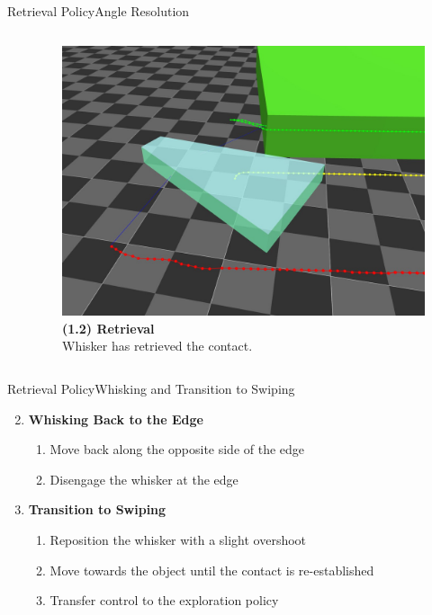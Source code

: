 \documentclass[AIRbeamer
,optEnglish
,optBiber
,optBibstyleAlphabetic
,optBeamerClassicFormat%
]{AIRlatex}
\begin{document}
\begin{frame}[c]{Retrieval Policy}{Angle Resolution}
\begin{columns}[T,onlytextwidth]
\begin{column}[T]{0.48\textwidth}
            \end{column}
            \begin{column}[T]{0.48\textwidth}
                \begin{figure}[H]
                    \centering
                    \captionsetup{justification=centering}
                    \includegraphics[width=\textwidth]{figures/retrieval/retrieval}
                    \caption{\textbf{(1.2) Retrieval}\\Whisker has retrieved the contact.}
                \end{figure}
            \end{column}
        \end{columns}
    \end{frame}
    \begin{frame}{Retrieval Policy}{Whisking and Transition to Swiping}
        \begin{enumerate}
            \setcounter{enumi}{1}
            \item \textbf{Whisking Back to the Edge}
            \begin{enumerate}
                \item Move back along the opposite side of the edge
                \item Disengage the whisker at the edge
            \end{enumerate}
            \item \textbf{Transition to Swiping}
            \begin{enumerate}
                \item Reposition the whisker with a slight overshoot
                \item Move towards the object until the contact is re-established
                \item Transfer control to the exploration policy
            \end{enumerate}
        \end{enumerate}
    \end{frame}
\end{document}
